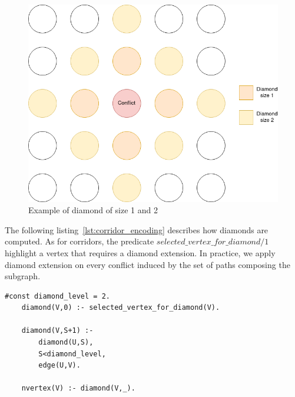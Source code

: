 \begin{figure}[H]
  \centering
  \caption{Example of diamond of size 1 and 2}\label{img:diamond}
  \includegraphics[width=\widthimg]{img/diamond.drawio.png}
\end{figure}


The following listing~\ref{lst:corridor_encoding} describes how diamonds are computed. As for corridors, the predicate \(selected\_vertex\_for\_diamond/1\) highlight a vertex that requires a diamond extension. In practice, we apply diamond extension on every conflict induced by the set of paths composing the subgraph. 

\begin{minipage}[H]{\linewidth}
\begin{lstlisting}[style=mystyle, caption={Diamond extension encoding}, label={lst:diamond_encoding}]
    #const diamond_level = 2.
    diamond(V,0) :- selected_vertex_for_diamond(V).
    
    diamond(V,S+1) :- 
        diamond(U,S), 
        S<diamond_level, 
        edge(U,V).
    
    nvertex(V) :- diamond(V,_).
\end{lstlisting}
\end{minipage}

